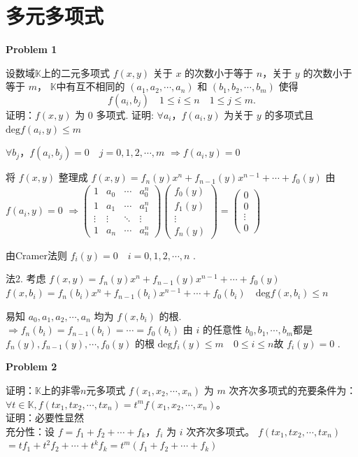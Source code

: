 \section{多元多项式}
\textbf{Problem 1}
\par
设数域$\mathbb{K}$上的二元多项式 \(f(x,y)\) 关于 \(x\) 的次数小于等于 \(n\)，关于 \(y\) 的次数小于等于 \(m\)，
\(\mathbb{K}\)中有互不相同的 \((a_1, a_2, \cdots, a_n)\) 和 \((b_1, b_2, \cdots, b_m)\) 使得
\[f(a_i, b_j) \quad 1\leq i\leq n \quad 1\leq j\leq m.\]
证明：\(f(x,y)\) 为 \(0\) 多项式.
证明: \(\forall a_i\)，\(f(a_i,y)\) 为关于 \(y\) 的多项式且 \(\text{deg} f(a_i, y)\leq m\)
\par
\(\forall b_j\)，\(f(a_i, b_j) = 0\quad j = 0,1,2,\cdots,m\)
\(\Rightarrow f(a_i,y)=0\)
\par
将 \(f(x,y)\) 整理成 \(f(x,y)=f_n(y)x^n + f_{n - 1}(y)x^{n - 1}+\cdots + f_0(y)\)
由 \(f(a_i,y)=0\)
\(\Rightarrow\begin{pmatrix}1&a_0&\cdots&a_0^n\\1&a_1&\cdots&a_1^n\\\vdots&\vdots&\ddots&\vdots\\1&a_n&\cdots&a_n^n\end{pmatrix}\begin{pmatrix}f_0(y)\\f_1(y)\\\vdots\\f_n(y)\end{pmatrix}=\begin{pmatrix}0\\0\\\vdots\\0\end{pmatrix}\)

由Cramer法则 \(f_i(y)=0\quad i = 0,1,2,\cdots,n\)  .

法2. 考虑
\(f(x,y)=f_n(y)x^n + f_{n - 1}(y)x^{n - 1}+\cdots + f_0(y)\)
\(f(x,b_i)=f_n(b_i)x^n + f_{n - 1}(b_i)x^{n - 1}+\cdots + f_0(b_i)\quad \text{deg} f(x,b_i)\leq n\)
\par
易知 \(a_0,a_1,a_2,\cdots,a_n\) 均为 \(f(x,b_i)\) 的根.
\(\Rightarrow f_n(b_i)=f_{n - 1}(b_i)=\cdots = f_0(b_i)\)
由 \(i\) 的任意性
\(b_0,b_1,\cdots,b_m\)都是 \(f_n(y),f_{n - 1}(y),\cdots,f_0(y)\) 的根
\(\text{deg} f_i(y)\leq m\quad 0\leq i\leq n\)故
\(f_i(y)=0\)  .

\textbf{Problem 2} 
\par 
证明：\(\mathbb{K}\)上的非零\(n\)元多项式 \(f(x_1,x_2,\cdots,x_n)\) 为 \(m\) 次齐次多项式的充要条件为：
\(\forall t\in\mathbb{K}, f(tx_1,tx_2,\cdots,tx_n)=t^m f(x_1,x_2,\cdots,x_n)\)。
\\
证明：必要性显然
\\
充分性：设 \(f = f_1 + f_2+\cdots + f_k\)，\(f_i\) 为 \(i\) 次齐次多项式。
$f(tx_1,tx_2,\cdots,tx_n)$$=t f_1 + t^2 f_2+\cdots + t^k f_k=t^m(f_1 + f_2+\cdots + f_k)$

